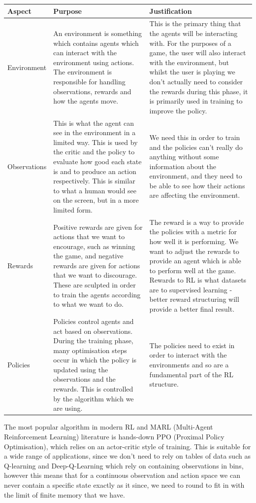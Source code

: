 \begin{center}
\begin{longtable}{|p{4cm}|p{6cm}|p{5cm}|}
    \hline
    Aspect & Purpose & Justification\\
    \hline
    \hline
    Environment & An environment is something which contains agents which can interact with the environment using actions. The environment is responsible for handling observations, rewards and how the agents move. & This is the primary thing that the agents will be interacting with. For the purposes of a game, the user will also interact with the environment, but whilst the user is playing we don't actually need to consider the rewards during this phase, it is primarily used in training to improve the policy.\\
    \hline
    Observations & This is what the agent can see in the environment in a limited way. This is used by the critic and the policy to evaluate how good each state is and to produce an action respectively. This is similar to what a human would see on the screen, but in a more limited form. & We need this in order to train and the policies can't really do anything without some information about the environment, and they need to be able to see how their actions are affecting the environment.\\
    \hline
    Rewards & Positive rewards are given for actions that we want to encourage, such as winning the game, and negative rewards are given for actions that we want to discourage. These are sculpted in order to train the agents according to what we want to do. & The reward is a way to provide the policies with a metric for how well it is performing. We want to adjust the rewards to provide an agent which is able to perform well at the game. Rewards to RL is what datasets are to supervised learning - better reward structuring will provide a better final result.\\
    \hline
    Policies & Policies control agents and act based on observations. During the training phase, many optimisation steps occur in which the policy is updated using the observations and the rewards. This is controlled by the algorithm which we are using. & The policies need to exist in order to interact with the environments and so are a fundamental part of the RL structure.\\
    \hline
\end{longtable}
\end{center}

The most popular algorithm in modern RL and MARL (Multi-Agent Reinforcement Learning) literature is hands-down PPO (Proximal Policy Optimisation), which relies on an actor-critic style of training. This is suitable for a wide range of applications, since we don't need to rely on tables of data such as Q-learning and Deep-Q-Learning which rely on containing observations in bins, however this means that for a continuous observation and action space we can never contain a specific state exactly as it since, we need to round to fit in with the limit of finite memory that we have.

